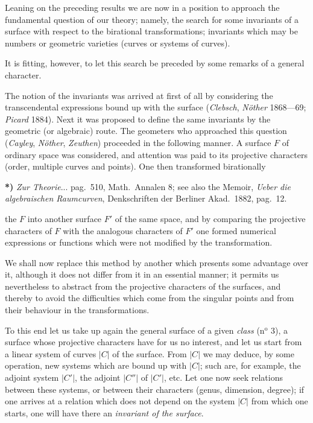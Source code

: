 \documentclass{article}
\begin{document}
Leaning on the preceding results we are now in a position to approach the fundamental question of our theory; namely, the search for some invariants of a surface with respect to the birational transformations; invariants which may be numbers or geometric varieties (curves or systems of curves).

It is fitting, however, to let this search be preceded by some remarks of a general character.

The notion of the invariants was arrived at first of all by considering the transcendental expressions bound up with the surface (\emph{Clebsch}, \emph{Nöther} 1868---69; \emph{Picard} 1884). Next it was proposed to define the same invariants by the geometric (or algebraic) route. The geometers who approached this question (\emph{Cayley}, \emph{Nöther}, \emph{Zeuthen}) proceeded in the following manner. A surface $F$ of ordinary space was considered, and attention was paid to its projective characters (order, multiple curves and points). One then transformed birationally

\textbf{*)} \emph{Zur Theorie}... pag.\ 510, Math.\ Annalen 8; see also the Memoir, \emph{Ueber die algebraischen Raumcurven}, Denkschriften der Berliner Akad.\ 1882, pag.\ 12.

the $F$ into another surface $F'$ of the same space, and by comparing the projective characters of $F$ with the analogous characters of $F'$ one formed numerical expressions or functions which were not modified by the transformation.

We shall now replace this method by another which presents some advantage over it, although it does not differ from it in an essential manner; it permits us nevertheless to abstract from the projective characters of the surfaces, and thereby to avoid the difficulties which come from the singular points and from their behaviour in the transformations.

To this end let us take up again the general surface of a given \emph{class} (n${}^{\text{o}}$ 3), a surface whose projective characters have for us no interest, and let us start from a linear system of curves $|C|$ of the surface. From $|C|$ we may deduce, by some operation, new systems which are bound up with $|C|$; such are, for example, the adjoint system $|C'|$, the adjoint $|C''|$ of $|C'|$, etc. Let one now seek relations between these systems, or between their characters (genus, dimension, degree); if one arrives at a relation which does not depend on the system $|C|$ from which one starts, one will have there an \emph{invariant of the surface}.
\end{document}
